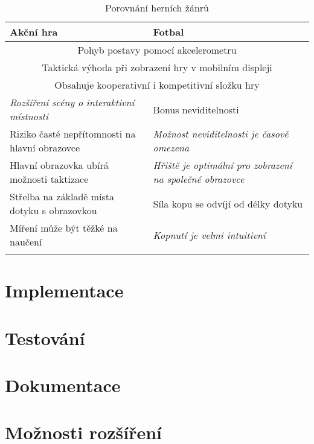 \documentclass[thesis=B,czech,hidelinks]{FITthesis}[2012/06/26] %
\begin{document}
\begin{table}[h]
\caption{Porovnání herních žánrů}
\label{table:game_comparison}
\begin{tabularx}{\textwidth}{|X|X|}
\hline
\textbf{Akční hra} & \textbf{Fotbal} \\ \hline
\multicolumn{2}{|c|}{Pohyb postavy pomocí akcelerometru}\\ \hline
\multicolumn{2}{|c|}{Taktická výhoda při zobrazení hry v mobilním displeji}\\ \hline
\multicolumn{2}{|c|}{Obsahuje kooperativní i kompetitivní složku hry}\\ \hline
\emph{Rozšíření scény o interaktivní místnosti} & Bonus neviditelnosti \\ \hline
Riziko časté nepřítomnosti na hlavní obrazovce & \emph{Možnost neviditelnosti je časově omezena} \\ \hline
Hlavní obrazovka ubírá možnosti taktizace & \emph{Hřiště je optimální pro zobrazení na společné obrazovce} \\ \hline

Střelba na základě místa dotyku s obrazovkou & Síla kopu se odvíjí od délky dotyku \\ \hline
Míření může být těžké na naučení & \emph{Kopnutí je velmi intuitivní} \\ \hline

 & \emph{} \\ \hline

\end{tabularx}
\end{table}






\section{Implementace}
\section{Testování}
\section{Dokumentace}
\section{Možnosti rozšíření}
\end{document}
